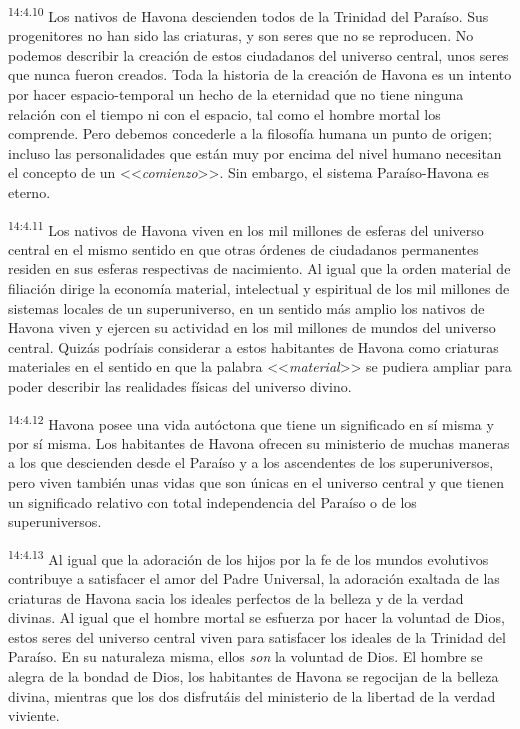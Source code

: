 \par
\textsuperscript{14:4.10} Los nativos de Havona descienden todos de la Trinidad del Paraíso. Sus progenitores no han sido las criaturas, y son seres que no se reproducen. No podemos describir la creación de estos ciudadanos del universo central, unos seres que nunca fueron creados. Toda la historia de la creación de Havona es un intento por hacer espacio-temporal un hecho de la eternidad que no tiene ninguna relación con el tiempo ni con el espacio, tal como el hombre mortal los comprende. Pero debemos concederle a la filosofía humana un punto de origen; incluso las personalidades que están muy por encima del nivel humano necesitan el concepto de un <<\textit{comienzo}>>. Sin embargo, el sistema Paraíso-Havona es eterno.

\par
\textsuperscript{14:4.11} Los nativos de Havona viven en los mil millones de esferas del universo central en el mismo sentido en que otras órdenes de ciudadanos permanentes residen en sus esferas respectivas de nacimiento. Al igual que la orden material de filiación dirige la economía material, intelectual y espiritual de los mil millones de sistemas locales de un superuniverso, en un sentido más amplio los nativos de Havona viven y ejercen su actividad en los mil millones de mundos del universo central. Quizás podríais considerar a estos habitantes de Havona como criaturas materiales en el sentido en que la palabra <<\textit{material}>> se pudiera ampliar para poder describir las realidades físicas del universo divino.

\par
\textsuperscript{14:4.12} Havona posee una vida autóctona que tiene un significado en sí misma y por sí misma. Los habitantes de Havona ofrecen su ministerio de muchas maneras a los que descienden desde el Paraíso y a los ascendentes de los superuniversos, pero viven también unas vidas que son únicas en el universo central y que tienen un significado relativo con total independencia del Paraíso o de los superuniversos.

\par
\textsuperscript{14:4.13} Al igual que la adoración de los hijos por la fe de los mundos evolutivos contribuye a satisfacer el amor del Padre Universal, la adoración exaltada de las criaturas de Havona sacia los ideales perfectos de la belleza y de la verdad divinas. Al igual que el hombre mortal se esfuerza por hacer la voluntad de Dios, estos seres del universo central viven para satisfacer los ideales de la Trinidad del Paraíso. En su naturaleza misma, ellos \textit{son} la voluntad de Dios. El hombre se alegra de la bondad de Dios, los habitantes de Havona se regocijan de la belleza divina, mientras que los dos disfrutáis del ministerio de la libertad de la verdad viviente.

